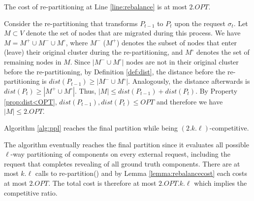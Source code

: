 \begin{lemma}	\label{lemma:rebalancecost}
	The cost of re-partitioning at Line \ref{line:rebalance} is at most $2.OPT$.
\end{lemma}
\begin{IEEEproof}
	Consider the re-partitioning that transforms $P_{t-1}$ to $P_t$ upon the request $\sigma_t$.
	Let $M \subset V$ denote the set of nodes that are migrated during this process.
	We have $M = M^+ \cup M^- \cup M^\circ$,
	where $M^-$ ($M^+$) denotes the subset of nodes that
	enter (leave) their original cluster during the re-partitioning,
	and $M^\circ$ denotes the set of remaining nodes in $M$.
	Since $|M^- \cup M^\circ|$ nodes are not in their original cluster before the re-partitioning,
	by Definition \ref{def:dist},
	the distance before the re-partitioning is $dist(P_{t-1}) \geq | M^- \cup M^\circ |$.
	Analogously,
	 the distance afterwards is $dist(P_{t}) \geq | M^+ \cup M^\circ |$.
	Thus,
	$|M| \leq dist(P_{t-1}) + dist(P_{t})$.
	By Property \ref{prop:dist<OPT},
	$dist(P_{t-1}) , dist(P_{t}) \leq OPT$
	and therefore we have	
	$|M| \leq 2.OPT$.
\end{IEEEproof}

\begin{theorem}	\label{thm:upperbound}
	Algorithm \ref{alg:ppl} reaches the final partition while being $(2.k.\ell)$-competitive.
\end{theorem}
\begin{IEEEproof}
	The algorithm eventually reaches the final partition since it
	 evaluates all possible $\ell$-way partitioning of components on every external request,
	including the request that completes revealing of all ground truth components.
	There are at most $k.\ell$ calls to re-partition() and by Lemma \ref{lemma:rebalancecost} each costs at most $2.OPT$.
	The total cost is therefore at most $2.OPT.k.\ell$ which implies the competitive ratio.
\end{IEEEproof}